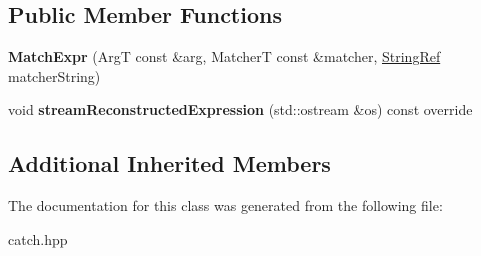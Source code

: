 \subsection*{Public Member Functions}
\begin{DoxyCompactItemize}
\item 
{\bfseries Match\+Expr} (ArgT const \&arg, MatcherT const \&matcher, \hyperlink{classCatch_1_1StringRef}{String\+Ref} matcher\+String)\hypertarget{classCatch_1_1MatchExpr_ab5b9ecc4fb9e91f5f48756e75affe93d}{}\label{classCatch_1_1MatchExpr_ab5b9ecc4fb9e91f5f48756e75affe93d}

\item 
void {\bfseries stream\+Reconstructed\+Expression} (std\+::ostream \&os) const override\hypertarget{classCatch_1_1MatchExpr_ad3e41adb597750b2219bb37e51185629}{}\label{classCatch_1_1MatchExpr_ad3e41adb597750b2219bb37e51185629}

\end{DoxyCompactItemize}
\subsection*{Additional Inherited Members}


The documentation for this class was generated from the following file\+:\begin{DoxyCompactItemize}
\item 
catch.\+hpp\end{DoxyCompactItemize}
